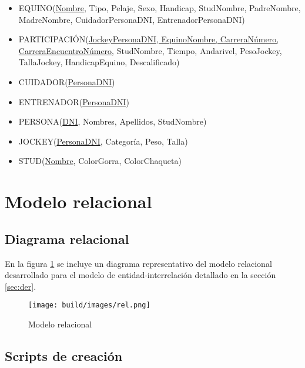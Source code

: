 \documentclass[a4paper,11pt]{article}
\begin{document}
\begin{itemize}

  \item EQUINO(\uline{Nombre}, Tipo, Pelaje, Sexo, Handicap, StudNombre, PadreNombre, MadreNombre, CuidadorPersonaDNI, EntrenadorPersonaDNI)

  \item PARTICIPACIÓN(\uline{JockeyPersonaDNI, EquinoNombre, CarreraNúmero, CarreraEncuentroNúmero}, StudNombre, Tiempo, Andarivel, PesoJockey, TallaJockey, HandicapEquino, Descalificado)

  \item CUIDADOR(\uline{PersonaDNI})

  \item ENTRENADOR(\uline{PersonaDNI})

  \item PERSONA(\uline{DNI}, Nombres, Apellidos, StudNombre)

  \item JOCKEY(\uline{PersonaDNI}, Categoría, Peso, Talla)

  \item STUD(\uline{Nombre}, ColorGorra, ColorChaqueta)

\end{itemize}

\section{Modelo relacional}

\subsection{Diagrama relacional}

En la figura \ref{fig:relacional} se incluye un diagrama representativo del
modelo relacional desarrollado para el modelo de entidad-interrelación
detallado en la sección \ref{sec:der}.

\begin{figure}[h!t]
  \centering
  \texttt{[image: build/images/rel.png]}
  \caption{Modelo relacional} \label{fig:relacional}
\end{figure}

\FloatBarrier

\subsection{Scripts de creación}
\end{document}
